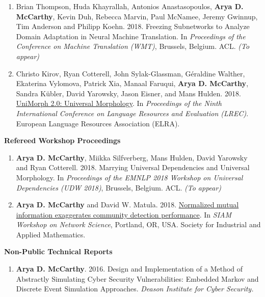 \documentclass[margin, 10pt]{res} %
\begin{document}
\begin{resume}
\begin{enumerate}
\item Brian Thompson, Huda Khayrallah, Antonios Anastasopoulos, \textbf{Arya D. McCarthy}, Kevin Duh, Rebecca Marvin, Paul McNamee, Jeremy Gwinnup, Tim Anderson and Philipp Koehn. 2018. Freezing Subnetworks to Analyze Domain Adaptation in Neural Machine Translation. In \emph{Proceedings of the Conference on Machine Translation (WMT)}, Brussels, Belgium. ACL. \emph{(To appear)}

\item Christo Kirov, Ryan Cotterell, John Sylak-Glassman, G\'eraldine Walther, Ekaterina Vylomova, Patrick Xia, Manaal Faruqui, \textbf{Arya D. McCarthy}, Sandra K{\"u}bler, David Yarowsky, Jason Eisner, and Mans Hulden. 2018. \href{http://www.lrec-conf.org/proceedings/lrec2018/pdf/789.pdf}{UniMorph 2.0: Universal Morphology}. In \emph{Proceedings of the Ninth International Conference on Language Resources and Evaluation (LREC)}. European Language Resources Association (ELRA).
\end{enumerate}

\filbreak

\textbf{Refereed Workshop Proceedings}
\begin{enumerate}[resume]
\item \textbf{Arya D. McCarthy}, Miikka Silfverberg, Mans Hulden, David Yarowsky and Ryan Cotterell. 2018. Marrying Universal Dependencies and Universal Morphology. In \emph{Proceedings of the EMNLP 2018 Workshop on Universal Dependencies (UDW 2018)}, Brussels, Belgium. ACL. \emph{(To appear)}

\item \textbf{Arya D. McCarthy} and David W. Matula. 2018. \href{https://cloud.skewed.de/index.php/s/ypEW2ym8JkeaZ8p#pdfviewer}{Normalized mutual information exaggerates community detection performance}. In \emph{SIAM Workshop on Network Science}, Portland, OR, USA. Society for Industrial and Applied Mathematics.
\end{enumerate}

\filbreak
\textbf{Non-Public Technical Reports}
\begin{enumerate}[resume]
\item \textbf{Arya D. McCarthy}. 2016. Design and Implementation of a Method of Abstractly Simulating Cyber Security Vulnerabilities: Embedded Markov and Discrete Event Simulation Approaches. \emph{Deason Institute for Cyber Security.}
\end{enumerate}


\end{resume}
\end{document}
